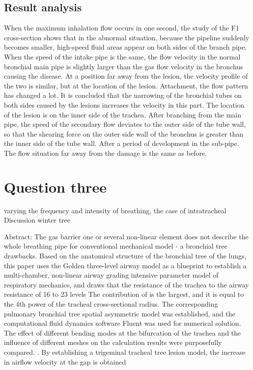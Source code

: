 \documentclass[
]{article}
\begin{document}
\hypertarget{result-analysis}{%
\subsection{Result analysis}\label{result-analysis}}

When the maximum inhalation flow occurs in one second, the study of the
F1 cross-section shows that in the abnormal situation, because the
pipeline suddenly becomes smaller, high-speed fluid areas appear on both
sides of the branch pipe. When the speed of the intake pipe is the same,
the flow velocity in the normal bronchial main pipe is slightly larger
than the gas flow velocity in the bronchus causing the disease. At a
position far away from the lesion, the velocity profile of the two is
similar, but at the location of the lesion. Attachment, the flow pattern
has changed a lot. It is concluded that the narrowing of the bronchial
tubes on both sides caused by the lesions increases the velocity in this
part. The location of the lesion is on the inner side of the trachea.
After branching from the main pipe, the speed of the secondary flow
deviates to the outer side of the tube wall, so that the shearing force
on the outer side wall of the bronchus is greater than the inner side of
the tube wall. After a period of development in the sub-pipe. The flow
situation far away from the damage is the same as before.

\hypertarget{question-three}{%
\section{\texorpdfstring{Question three
}{Question three }}\label{question-three}}

varying the frequency and intensity of breathing, the case of
intratracheal Discussion winter tree

Abstract: The gas barrier one or several non-linear element does not
describe the whole breathing pipe for conventional mechanical model - a
bronchial tree drawbacks. Based on the anatomical structure of the
bronchial tree of the lungs, this paper uses the Golden three-level
airway model as a blueprint to establish a multi-chamber, non-linear
airway grading intensive parameter model of respiratory mechanics, and
draws that the resistance of the trachea to the airway resistance of 16
to 23 levels The contribution of is the largest, and it is equal to the
4th power of the tracheal cross-sectional radius. The corresponding
pulmonary bronchial tree spatial asymmetric model was established, and
the computational fluid dynamics software Fluent was used for numerical
solution. The effect of different bending modes at the bifurcation of
the trachea and the influence of different meshes on the calculation
results were purposefully compared. . By establishing a trigeminal
tracheal tree lesion model, the increase in airflow velocity at the gap
is obtained
\end{document}
